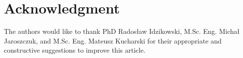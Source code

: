 \section*{Acknowledgment}

The authors would like to thank PhD Radosław Idzikowski, M.Sc. Eng. Michał Jaroszczuk, and M.Sc. Eng. Mateusz Kucharski for their appropriate and constructive suggestions to improve this article.


